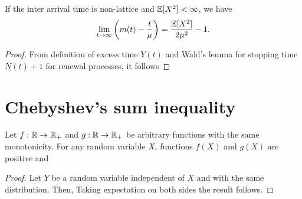 \documentclass[a4paper,10pt,english]{article}
\begin{document}
\begin{prop}
If the inter arrival time is non-lattice and $\mathbb{E}[X^2] < \infty$, we have 
\begin{align*}
\lim_{t \to \infty} \left(m(t)-\frac{t}{\mu}\right) = \frac{\mathbb{E}[X^2]}{2\mu^2}-1.
\end{align*} 
\begin{proof}
From definition of excess time $Y(t)$ and Wald's lemma for stopping time $N(t)+1$ for renewal processes, it follows  
\end{proof}

\end{prop}

\appendix

\section{Chebyshev's sum inequality}
\begin{lem}
Let $f:\mathbb{R} \to \mathbb{R}_{+}$ and $g : \mathbb{R} \to \mathbb{R}_{+}$ be arbitrary functions with the same monotonicity.  
For any random variable $X$, functions $f(X)$ and $g(X)$ are positive and
\end{lem}
\begin{proof} 
Let $Y$ be a random variable independent of $X$ and with the same distribution. 
Then, 
Taking expectation on both sides the result follows. 
\end{proof} 
\end{document}
